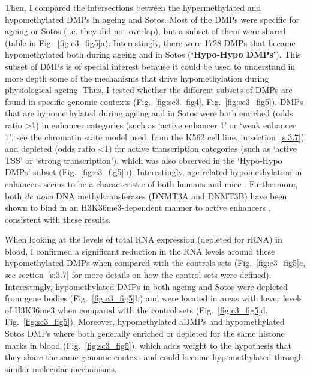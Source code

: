 \bigskip

Then, I compared the intersections between the hypermethylated and hypomethylated DMPs in ageing and Sotos. Most of the DMPs were specific for ageing or Sotos (i.e. they did not overlap), but a subset of them were shared (table in Fig.~\ref{fig:c3_fig5}a). Interestingly, there were 1728 DMPs that became hypomethylated both during ageing and in Sotos (\textbf{`Hypo-Hypo DMPs'}). This subset of DMPs is of special interest because it could be used to understand in more depth some of the mechanisms that drive hypomethylation during physiological ageing. Thus, I tested whether the different subsets of DMPs are found in specific genomic contexts (Fig.~\ref{fig:sc3_fig4}, Fig.~\ref{fig:sc3_fig5}). DMPs that are hypomethylated during ageing and in Sotos were both enriched (odds ratio >1) in enhancer categories (such as `active enhancer 1' or `weak enhancer 1', see the chromatin state model used, from the K562 cell line, in section~\ref{s:3.7}) and depleted (odds ratio <1) for active transcription categories (such as `active TSS' or `strong transcription'), which was also observed in the `Hypo-Hypo DMPs' subset (Fig.~\ref{fig:c3_fig5}b). Interestingly, age-related hypomethylation in enhancers seems to be a characteristic of both humans \citep{Slieker2016,Slieker2018} and mice \citep{Cole2017}. Furthermore, both \textit{de novo} DNA methyltransferases (DNMT3A and DNMT3B) have been shown to bind in an H3K36me3-dependent manner to active enhancers \citep{Rinaldi2016}, consistent with these results.

\bigskip

When looking at the levels of total RNA expression (depleted for \acrshort{rRNA}) in blood, I confirmed a significant reduction in the RNA levels around these hypomethylated DMPs when compared with the controls sets (Fig.~\ref{fig:c3_fig5}c, see section~\ref{s:3.7} for more details on how the control sets were defined). Interestingly, hypomethylated DMPs in both ageing and Sotos were depleted from gene bodies (Fig.~\ref{fig:c3_fig5}b) and were located in areas with lower levels of H3K36me3 when compared with the control sets (Fig.~\ref{fig:c3_fig5}d, Fig.~\ref{fig:sc3_fig5}). Moreover, hypomethylated aDMPs and hypomethylated Sotos DMPs where both generally enriched or depleted for the same histone marks in blood (Fig.~\ref{fig:sc3_fig5}), which adds weight to the hypothesis that they share the same genomic context and could become hypomethylated through similar molecular mechanisms.

\bigskip

